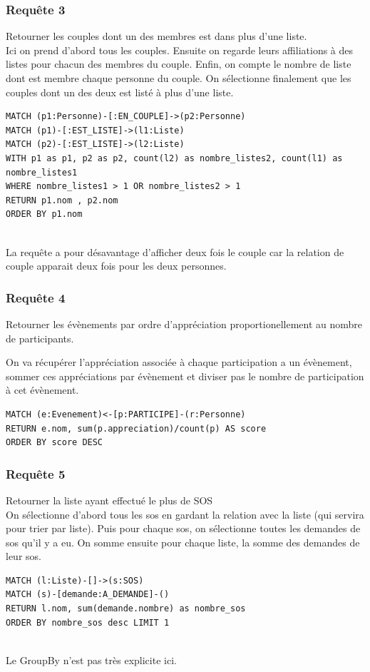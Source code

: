 \documentclass[a4paper,oneside,1pt]{article}
\begin{document}
\subsubsection{Requête 3}
Retourner les couples dont un des membres est dans plus d'une liste.
\\
Ici on prend d'abord tous les couples. Ensuite on regarde leurs affiliations à des listes pour chacun des membres du couple. Enfin, on compte le nombre de liste dont est membre chaque personne du couple. On sélectionne finalement que les couples dont un des deux est listé à plus d'une liste.
\\
\begin{verbatim}
MATCH (p1:Personne)-[:EN_COUPLE]->(p2:Personne)
MATCH (p1)-[:EST_LISTE]->(l1:Liste)
MATCH (p2)-[:EST_LISTE]->(l2:Liste)
WITH p1 as p1, p2 as p2, count(l2) as nombre_listes2, count(l1) as nombre_listes1
WHERE nombre_listes1 > 1 OR nombre_listes2 > 1 
RETURN p1.nom , p2.nom
ORDER BY p1.nom
\end{verbatim}
\\
La requête a pour désavantage d'afficher deux fois le couple car la relation de couple apparait deux fois pour les deux personnes.

\subsubsection{Requête 4}
Retourner les évènements par ordre d'appréciation proportionellement au nombre de participants.

On va récupérer l'appréciation associée à chaque participation a un évènement, sommer ces appréciations par évènement et diviser pas le nombre de participation à cet évènement.
\begin{verbatim}
MATCH (e:Evenement)<-[p:PARTICIPE]-(r:Personne)
RETURN e.nom, sum(p.appreciation)/count(p) AS score
ORDER BY score DESC
\end{verbatim}

\subsubsection{Requête 5}
Retourner la liste ayant effectué le plus de SOS
\\
On sélectionne d'abord tous les sos en gardant la relation avec la liste (qui servira pour trier par liste). Puis pour chaque sos, on sélectionne toutes les demandes de sos qu'il y a eu. On somme ensuite pour chaque liste, la somme des demandes de leur sos.
\\
\begin{verbatim}
MATCH (l:Liste)-[]->(s:SOS)
MATCH (s)-[demande:A_DEMANDE]-()
RETURN l.nom, sum(demande.nombre) as nombre_sos
ORDER BY nombre_sos desc LIMIT 1
\end{verbatim}
\\ 
Le GroupBy n'est pas très explicite ici.
\end{document}
